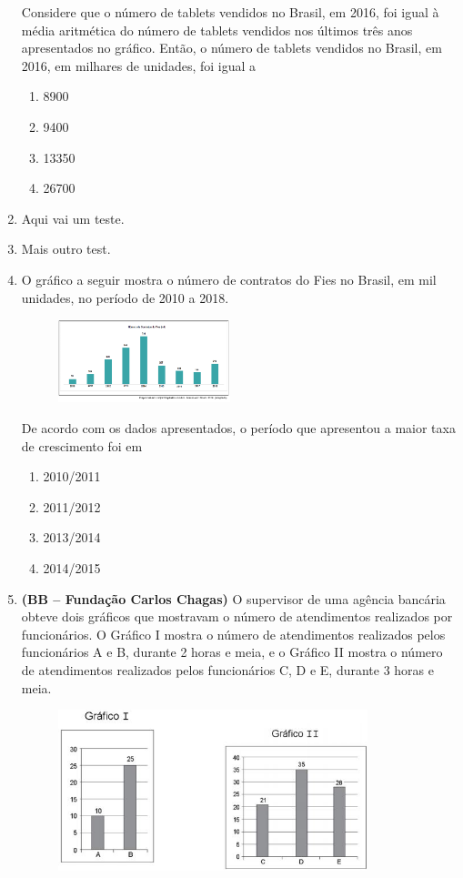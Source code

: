 \documentclass[twocolumn,oneside,a4paper,10pt]{article}
\begin{document}
\begin{enumerate}
Considere que o número de tablets vendidos no Brasil, em 2016, foi igual à média aritmética do número de tablets vendidos nos últimos três anos apresentados no gráfico. Então, o número de tablets vendidos no Brasil, em 2016, em milhares de unidades, foi igual a

\begin{enumerate}
\item 8900
\item 9400
\item 13350
\item 26700
\end{enumerate}

\item Aqui vai um teste.

\item Mais outro test.

\item O gráfico a seguir mostra o número de contratos do Fies no Brasil, em mil unidades, no período de 2010 a 2018.

\begin{figure}[!htb]
\center
\includegraphics[width=5cm]{Figuras/g7.png}
\end{figure}

De acordo com os dados apresentados, o período que apresentou a maior taxa de crescimento foi em
\begin{enumerate}
\item 2010/2011
\item 2011/2012
\item 2013/2014
\item 2014/2015
\end{enumerate}


\item  \textbf{(BB – Fundação Carlos Chagas)} O supervisor de uma agência bancária obteve dois gráficos que mostravam o número de atendimentos realizados por funcionários. O Gráfico I mostra o número de atendimentos realizados pelos funcionários A e B, durante 2 horas e meia, e o Gráfico II mostra o número de atendimentos realizados pelos funcionários C, D e E, durante 3 horas e meia.

\newpage
\begin{figure}[!htb]
\center
\includegraphics[width=9cm]{Figuras/g9.jpg}
\end{figure}


\end{enumerate}
\end{document}
